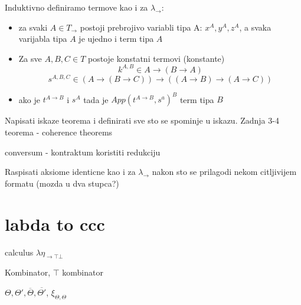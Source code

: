 \begin{definition}
  Induktivno definiramo termove kao i za $\lambda_\to$:
  \begin{itemize}
    \item za svaki $A \in T_\to$ postoji prebrojivo variabli tipa A: $x^A, y^A, z^A$, a svaka varijabla tipa $A$ je ujedno i term tipa $A$
    \item Za sve $A, B, C \in T$ postoje konstatni termovi (konstante)
      \begin{equation*}
        k^{A, B} \in A \to (B \to A)
      \end{equation*}
      \begin{equation*}
        s^{A, B, C} \in (A \to (B \to C)) \to ((A \to B) \to (A \to C))
      \end{equation*}
    \item ako je $t^{A \to B}$ i $s^A$ tada je $App(t^{A \to B}, s^a) ^B$ term tipa $B$
  \end{itemize}

\end{definition}

Napisati iskaze teorema i definirati sve sto se spominje u iskazu.
Zadnja 3-4 teorema - coherence theorems

conversum - kontraktum
koristiti redukciju
\begin{definition}
  Raspisati aksiome identicne kao i za $\lambda_\to$ nakon sto se prilagodi nekom citljivijem formatu (mozda u dva stupca?)
\end{definition}
\section{labda to ccc}

\begin{definition}
  calculus $\lambda \eta_{\to \top \bot}$
\end{definition}

\begin{definition}
  Kombinator, $\top$ kombinator
\end{definition}


\begin{definition}
  $\Theta, \Theta', \overline{\Theta}, $, $\xi_{\Theta, \Theta}$
\end{definition}

